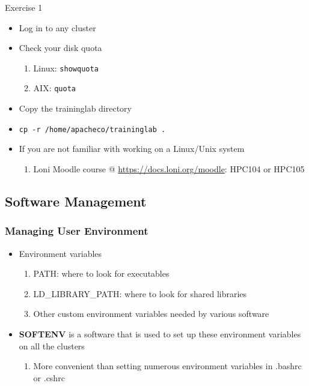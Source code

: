\documentclass[slidestop,mathserif,compress,xcolor=svgnames,table]{beamer}
\newcommand*\vardiamond{\textcolor{tigerspurple}{%
  \ensuremath{\blacklozenge}}}
\newenvironment{ablock}[0]
{
\begin{beamerboxesrounded}[upper=uppercol,lower=lowercol,shadow=true]}
{\end{beamerboxesrounded}}
\newenvironment{eblock}[0]
{
\begin{beamerboxesrounded}[upper=uppercol2,lower=lowercol2,shadow=true]}
{\end{beamerboxesrounded}}
\begin{document}
\begin{frame}
\begin{eblock}{Exercise 1}
 \begin{itemize}
  \item Log in to any cluster
  \item Check your disk quota
  \begin{enumerate}
    \item Linux: \texttt{showquota}
    \item AIX: \texttt{quota}
  \end{enumerate}
  \item Copy the traininglab directory
  \item[] \texttt{cp -r /home/apacheco/traininglab .}
 \end{itemize}
\end{eblock}

\begin{ablock}{}
 \begin{itemize}
  \item If you are not familiar with working on a Linux/Unix system
  \begin{enumerate}
   \item Loni Moodle course @ \url{https://docs.loni.org/moodle}: HPC104 or HPC105
  \end{enumerate}

 \end{itemize}

\end{ablock}


\end{frame}


\subsection{Software Management}
\begin{frame}
\frametitle{\small Managing User Environment}
\begin{itemize}
\item Environment variables
\begin{enumerate}
\item[$\vardiamond$]PATH: where to look for executables
\item[$\vardiamond$]LD\_LIBRARY\_PATH: where to look for shared libraries
\item[$\vardiamond$]Other custom environment variables needed by various software
\end{enumerate}
\item {\bf SOFTENV} is a software that is used to set up these environment variables on all the clusters
\begin{enumerate}
\item[$\vardiamond$]More convenient than setting numerous environment variables in .bashrc or .cshrc
\end{enumerate}
\end{itemize}
\end{frame}
\end{document}
